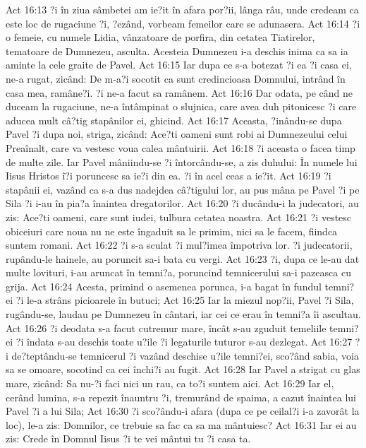 Act 16:13  ?i în ziua sâmbetei am ie?it în afara por?ii, lânga râu, unde credeam ca este loc de rugaciune ?i, ?ezând, vorbeam femeilor care se adunasera.
Act 16:14  ?i o femeie, cu numele Lidia, vânzatoare de porfira, din cetatea Tiatirelor, tematoare de Dumnezeu, asculta. Acesteia Dumnezeu i-a deschis inima ca sa ia aminte la cele graite de Pavel.
Act 16:15  Iar dupa ce s-a botezat ?i ea ?i casa ei, ne-a rugat, zicând: De m-a?i socotit ca sunt credincioasa Domnului, intrând în casa mea, ramâne?i. ?i ne-a facut sa ramânem.
Act 16:16  Dar odata, pe când ne duceam la rugaciune, ne-a întâmpinat o slujnica, care avea duh pitonicesc ?i care aducea mult câ?tig stapânilor ei, ghicind.
Act 16:17  Aceasta, ?inându-se dupa Pavel ?i dupa noi, striga, zicând: Ace?ti oameni sunt robi ai Dumnezeului celui Preaînalt, care va vestesc voua calea mântuirii.
Act 16:18  ?i aceasta o facea timp de multe zile. Iar Pavel mâniindu-se ?i întorcându-se, a zis duhului: În numele lui Iisus Hristos î?i poruncesc sa ie?i din ea. ?i în acel ceas a ie?it.
Act 16:19  ?i stapânii ei, vazând ca s-a dus nadejdea câ?tigului lor, au pus mâna pe Pavel ?i pe Sila ?i i-au în pia?a înaintea dregatorilor.
Act 16:20  ?i ducându-i la judecatori, au zis: Ace?ti oameni, care sunt iudei, tulbura cetatea noastra.
Act 16:21  ?i vestesc obiceiuri care noua nu ne este îngaduit sa le primim, nici sa le facem, fiindca suntem romani.
Act 16:22  ?i s-a sculat ?i mul?imea împotriva lor. ?i judecatorii, rupându-le hainele, au poruncit sa-i bata cu vergi.
Act 16:23  ?i, dupa ce le-au dat multe lovituri, i-au aruncat în temni?a, poruncind temnicerului sa-i pazeasca cu grija.
Act 16:24  Acesta, primind o asemenea porunca, i-a bagat în fundul temni?ei ?i le-a strâns picioarele în butuci;
Act 16:25  Iar la miezul nop?ii, Pavel ?i Sila, rugându-se, laudau pe Dumnezeu în cântari, iar cei ce erau în temni?a îi ascultau.
Act 16:26  ?i deodata s-a facut cutremur mare, încât s-au zguduit temeliile temni?ei ?i îndata s-au deschis toate u?ile ?i legaturile tuturor s-au dezlegat.
Act 16:27  ?i de?teptându-se temnicerul ?i vazând deschise u?ile temni?ei, sco?ând sabia, voia sa se omoare, socotind ca cei închi?i au fugit.
Act 16:28  Iar Pavel a strigat cu glas mare, zicând: Sa nu-?i faci nici un rau, ca to?i suntem aici.
Act 16:29  Iar el, cerând lumina, s-a repezit înauntru ?i, tremurând de spaima, a cazut înaintea lui Pavel ?i a lui Sila;
Act 16:30  ?i sco?ându-i afara (dupa ce pe ceilal?i i-a zavorât la loc), le-a zis: Domnilor, ce trebuie sa fac ca sa ma mântuiesc?
Act 16:31  Iar ei au zis: Crede în Domnul Iisus ?i te vei mântui tu ?i casa ta.
